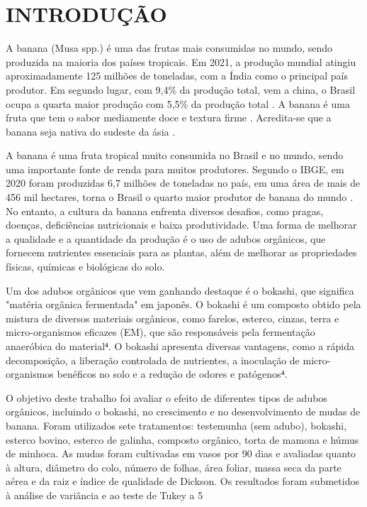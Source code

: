 \chapter{INTRODUÇÃO}

A banana (Musa spp.) é uma das frutas mais consumidas no mundo, sendo produzida na maioria dos países tropicais. Em 2021, a produção mundial atingiu aproximadamente 125 milhões de toneladas, com a Índia como o principal país produtor. Em segundo lugar, com 9,4\% da produção total, vem a china, o Brasil ocupa a quarta maior produção com 5,5\% da produção total \cite{banana}. A banana é uma fruta que tem o sabor mediamente doce e textura firme \cite{MATSUURA2004}. Acredita-se que a banana seja nativa do sudeste da ásia \cite{1956TaOo}.


A banana é uma fruta tropical muito consumida no Brasil e no mundo, sendo uma importante fonte de renda para muitos produtores. Segundo o IBGE, em 2020 foram produzidas 6,7 milhões de toneladas no país, em uma área de mais de 456 mil hectares, torna o Brasil o quarto maior produtor de banana do mundo \cite{banana}. No entanto, a cultura da banana enfrenta diversos desafios, como pragas, doenças, deficiências nutricionais e baixa produtividade. Uma forma de melhorar a qualidade e a quantidade da produção é o uso de adubos orgânicos, que fornecem nutrientes essenciais para as plantas, além de melhorar as propriedades físicas, químicas e biológicas do solo.

Um dos adubos orgânicos que vem ganhando destaque é o bokashi, que significa "matéria orgânica fermentada" em japonês. O bokashi é um composto obtido pela mistura de diversos materiais orgânicos, como farelos, esterco, cinzas, terra e micro-organismos eficazes (EM), que são responsáveis pela fermentação anaeróbica do material⁴. O bokashi apresenta diversas vantagens, como a rápida decomposição, a liberação controlada de nutrientes, a inoculação de micro-organismos benéficos no solo e a redução de odores e patógenos⁴.

O objetivo deste trabalho foi avaliar o efeito de diferentes tipos de adubos orgânicos, incluindo o bokashi, no crescimento e no desenvolvimento de mudas de banana. Foram utilizados sete tratamentos: testemunha (sem adubo), bokashi, esterco bovino, esterco de galinha, composto orgânico, torta de mamona e húmus de minhoca. As mudas foram cultivadas em vasos por 90 dias e avaliadas quanto à altura, diâmetro do colo, número de folhas, área foliar, massa seca da parte aérea e da raiz e índice de qualidade de Dickson. Os resultados foram submetidos à análise de variância e ao teste de Tukey a 5%

